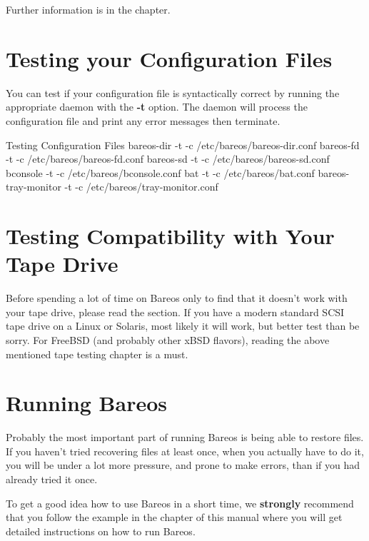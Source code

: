Further information is in the
 chapter.

\section{Testing your Configuration Files}

You can test if your configuration file is syntactically correct by running
the appropriate daemon with the {\bf -t} option. The daemon will process the
configuration file and print any error messages then terminate.

\begin{commands}{Testing Configuration Files}
bareos-dir -t -c /etc/bareos/bareos-dir.conf
bareos-fd -t -c /etc/bareos/bareos-fd.conf
bareos-sd -t -c /etc/bareos/bareos-sd.conf
bconsole -t -c /etc/bareos/bconsole.conf
bat -t -c /etc/bareos/bat.conf
bareos-tray-monitor -t -c /etc/bareos/tray-monitor.conf
\end{commands}

\label{TapeTesting}
\section{Testing Compatibility with Your Tape Drive}

Before spending a lot of time on Bareos only to find that it doesn't work
with your tape drive, please read the  section.
If you have a modern
standard SCSI tape drive on a Linux or Solaris, most likely it will work,
but better test than be sorry.  For FreeBSD (and probably other xBSD
flavors), reading the above mentioned tape testing chapter is a must.


\section{Running Bareos}
\label{Running1}

Probably the most important part of running Bareos is being able to restore
files. If you haven't tried recovering files at least once, when you actually
have to do it, you will be under a lot more pressure, and prone to make
errors, than if you had already tried it once.

To get a good idea how to use Bareos in a short time, we {\bf strongly}
recommend that you follow the example in the
 chapter of this manual where
you will get detailed instructions on how to run Bareos.

